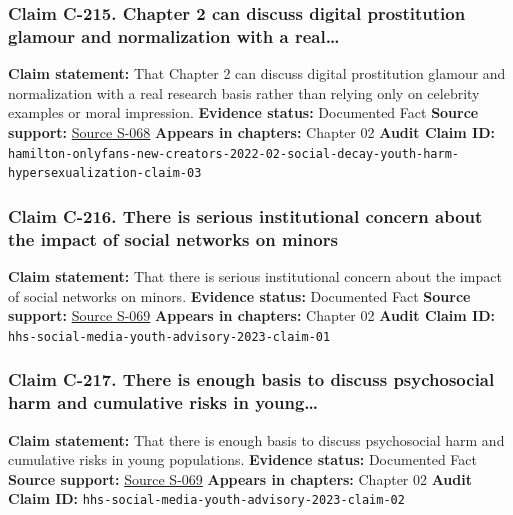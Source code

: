 \documentclass[
  american,
  11pt,
  letterpaper,
]{article}
\begin{document}
\subsubsection{Claim C-215. Chapter 2 can discuss digital prostitution
glamour and normalization with a
real\ldots{}}\label{claim-c-215-chapter-2-can-discuss-digital-prostitution-glamour-and-normalization-with-a-real}

\textbf{Claim statement:} That Chapter 2 can discuss digital
prostitution glamour and normalization with a real research basis rather
than relying only on celebrity examples or moral impression.
\textbf{Evidence status:} Documented Fact \textbf{Source support:}
\hyperref[source-s-068-nudes-shouldn-t-i-charge-for-these-motivations-of-new-sexual-content-creators-on-onlyfans]{Source
S-068} \textbf{Appears in chapters:} Chapter 02 \textbf{Audit Claim ID:}
\texttt{hamilton-onlyfans-new-creators-2022-02-social-decay-youth-harm-hypersexualization-claim-03}

\subsubsection{Claim C-216. There is serious institutional concern about
the impact of social networks on
minors}\label{claim-c-216-there-is-serious-institutional-concern-about-the-impact-of-social-networks-on-minors}

\textbf{Claim statement:} That there is serious institutional concern
about the impact of social networks on minors. \textbf{Evidence status:}
Documented Fact \textbf{Source support:}
\hyperref[source-s-069-social-media-and-youth-mental-health-the-u-s-surgeon-general-s-advisory]{Source
S-069} \textbf{Appears in chapters:} Chapter 02 \textbf{Audit Claim ID:}
\texttt{hhs-social-media-youth-advisory-2023-claim-01}

\subsubsection{Claim C-217. There is enough basis to discuss
psychosocial harm and cumulative risks in
young\ldots{}}\label{claim-c-217-there-is-enough-basis-to-discuss-psychosocial-harm-and-cumulative-risks-in-young}

\textbf{Claim statement:} That there is enough basis to discuss
psychosocial harm and cumulative risks in young populations.
\textbf{Evidence status:} Documented Fact \textbf{Source support:}
\hyperref[source-s-069-social-media-and-youth-mental-health-the-u-s-surgeon-general-s-advisory]{Source
S-069} \textbf{Appears in chapters:} Chapter 02 \textbf{Audit Claim ID:}
\texttt{hhs-social-media-youth-advisory-2023-claim-02}
\end{document}
